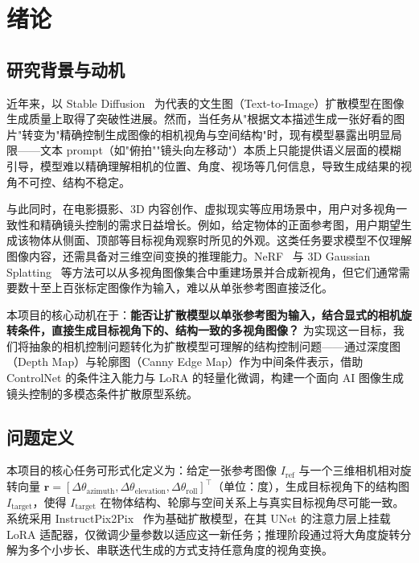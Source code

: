 \chapter{绪论}

\section{研究背景与动机}

近年来，以 Stable Diffusion~\cite{rombach2022latentdiffusion} 为代表的文生图（Text-to-Image）扩散模型在图像生成质量上取得了突破性进展。然而，当任务从"根据文本描述生成一张好看的图片"转变为"精确控制生成图像的相机视角与空间结构"时，现有模型暴露出明显局限——文本 prompt（如"俯拍""镜头向左移动"）本质上只能提供语义层面的模糊引导，模型难以精确理解相机的位置、角度、视场等几何信息，导致生成结果的视角不可控、结构不稳定\cite{zhang2023controlnet}。

与此同时，在电影摄影、3D 内容创作、虚拟现实等应用场景中，用户对多视角一致性和精确镜头控制的需求日益增长。例如，给定物体的正面参考图，用户期望生成该物体从侧面、顶部等目标视角观察时所见的外观。这类任务要求模型不仅理解图像内容，还需具备对三维空间变换的推理能力。NeRF~\cite{mildenhall2020nerf} 与 3D Gaussian Splatting~\cite{kerbl3dgaussians} 等方法可以从多视角图像集合中重建场景并合成新视角，但它们通常需要数十至上百张标定图像作为输入，难以从单张参考图直接泛化。

本项目的核心动机在于：\textbf{能否让扩散模型以单张参考图为输入，结合显式的相机旋转条件，直接生成目标视角下的、结构一致的多视角图像？} 为实现这一目标，我们将抽象的相机控制问题转化为扩散模型可理解的结构控制问题——通过深度图（Depth Map）与轮廓图（Canny Edge Map）作为中间条件表示，借助 ControlNet 的条件注入能力与 LoRA 的轻量化微调，构建一个面向 AI 图像生成镜头控制的多模态条件扩散原型系统。

\section{问题定义}

本项目的核心任务可形式化定义为：给定一张参考图像 $I_{\text{ref}}$ 与一个三维相机相对旋转向量 $\mathbf{r} = [\Delta\theta_{\text{azimuth}}, \Delta\theta_{\text{elevation}}, \Delta\theta_{\text{roll}}]^\top$（单位：度），生成目标视角下的结构图 $I_{\text{target}}$，使得 $I_{\text{target}}$ 在物体结构、轮廓与空间关系上与真实目标视角尽可能一致。系统采用 InstructPix2Pix~\cite{brooks2023instructpix2pix} 作为基础扩散模型，在其 UNet 的注意力层上挂载 LoRA 适配器，仅微调少量参数以适应这一新任务；推理阶段通过将大角度旋转分解为多个小步长、串联迭代生成的方式支持任意角度的视角变换。

